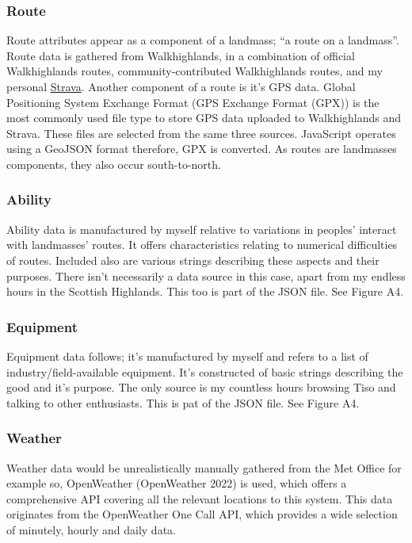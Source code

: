 \documentclass[11pt, english]{article}
\begin{document}
		\subsubsection{Route}

	Route attributes appear as a component of a landmass; ``a route on a landmass''. Route data is gathered from Walkhighlands, in a combination of official Walkhighlands routes, community-contributed Walkhighlands routes, and my personal \href{https://www.strava.com/athlete/training}{Strava}. Another component of a route is it's GPS data. Global Positioning System Exchange Format (GPS Exchange Format (GPX)) is the most commonly used file type to store GPS data uploaded to Walkhighlands and Strava. These files are selected from the same three sources. JavaScript operates using a GeoJSON format therefore, GPX is converted. As routes are landmasses components, they also occur south-to-north.

		\subsubsection{Ability}

	Ability data is manufactured by myself relative to variations in peoples' interact with landmasses' routes. It offers characteristics relating to numerical difficulties of routes. Included also are various strings describing these aspects and their purposes. There isn't necessarily a data source in this case, apart from my endless hours in the Scottish Highlands. This too is part of the JSON file. See Figure A4.

		\subsubsection{Equipment}

	Equipment data follows; it's manufactured by myself and refers to a list of industry/field-available equipment. It's constructed of basic strings describing the good and it's purpose. The only source is my countless hours browsing Tiso and talking to other enthusiasts. This is pat of the JSON file. See Figure A4.

		\subsubsection{Weather}

	Weather data would be unrealistically manually gathered from the Met Office for example so, OpenWeather (OpenWeather 2022) is used, which offers a comprehensive API covering all the relevant locations to this system. This data originates from the OpenWeather One Call API, which provides a wide selection of minutely, hourly and daily data.
\end{document}
